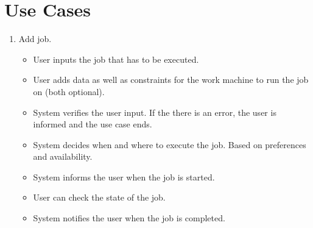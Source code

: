 \section{Use Cases}
\begin{enumerate}
  \item Add job.
  \begin{itemize}
    \item User inputs the job that has to be executed.
    \item User adds data as well as constraints for the work machine to run the job on (both optional).
    \item System verifies the user input.
    If the there is an error, the user is informed and the use case ends.
    \item System decides when and where to execute the job.
    Based on preferences and availability.
    \item System informs the user when the job is started.
    \item User can check the state of the job.
    \item System notifies the user when the job is completed.
  \end{itemize}
\end{enumerate}
